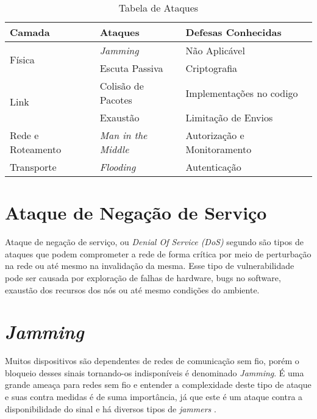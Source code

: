 \begin{table}[ht]
\centering
\caption{Tabela de Ataques}
\label{Tabela-de-Ataques}
\begin{tabular}{|l|l|l|}
\hline
\textbf{Camada}         & \textbf{Ataques}         & \textbf{Defesas Conhecidas}    \\ \hline
\multirow{2}{*}{Física} & \emph{Jamming}           & N\~ao Aplic\'avel              \\ \cline{2-3} 
                        & Escuta Passiva           & Criptografia                   \\ \hline
\multirow{2}{*}{Link}   & Colisão de Pacotes       & Implementa\c{c}\~oes no codigo \\ \cline{2-3} 
                        & Exaustão                 & Limitação de Envios            \\ \hline
Rede e Roteamento       & \emph{Man in the Middle} & Autorização e Monitoramento    \\ \hline
Transporte              & \emph{Flooding}          & Autenticação                   \\ \hline
\end{tabular}
\end{table}

\section{Ataque de Negação de Serviço}
\label{sec:2dos}
\par Ataque de negação de serviço, ou \emph{Denial Of Service (DoS)} segundo  são tipos de ataques que podem comprometer a rede de forma crítica por meio de perturbação na rede ou até mesmo na invalidação da mesma. Esse tipo de vulnerabilidade pode ser causada por exploração de falhas de hardware, bugs no software, exaustão dos recursos dos nós ou até mesmo condições do ambiente.

\section{\emph{Jamming}}
\label{sec:2jammer}
\par Muitos dispositivos são dependentes de redes de comunicação sem fio, por\'em o bloqueio desses sinais tornando-os indispon\'iveis \'e denominado \emph{Jamming}. \'E uma grande ameaça para redes sem fio e entender a complexidade deste tipo de ataque e suas contra medidas é de suma importância, j\'a que este é um ataque contra a disponibilidade do sinal e há diversos tipos de \emph{jammers} \cite{wilhelm2011a}.

